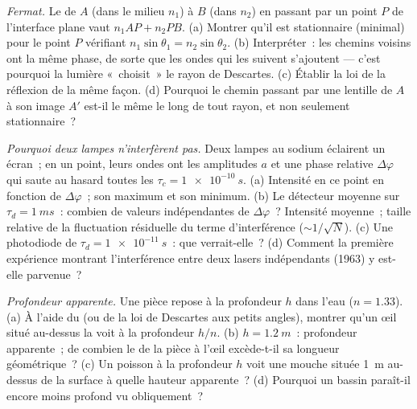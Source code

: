\begin{exercise}[$\star\star$]\label{exo:b2:scalar-light-model:7}
\emph{Fermat.} Le  de $A$ (dans le milieu $n_1$) à $B$ (dans
$n_2$) en passant par un point $P$ de l'interface plane vaut $n_1AP + n_2PB$. (a)
Montrer qu'il est stationnaire (minimal) pour le point $P$ vérifiant
$n_1\sin\theta_1 = n_2\sin\theta_2$. (b) Interpréter~: les chemins voisins ont la
même phase, de sorte que les ondes qui les suivent s'ajoutent --- c'est pourquoi la lumière
«~choisit~» le rayon de Descartes. (c) Établir la loi de la réflexion de la même
façon. (d) Pourquoi le chemin passant par une lentille de $A$ à son image $A'$ est-il le
même le long de tout rayon, et non seulement stationnaire~?
\end{exercise}

\begin{exercise}[$\star\star$]\label{exo:b2:scalar-light-model:8}
\emph{Pourquoi deux lampes n'interfèrent pas.} Deux lampes au sodium éclairent un
écran~; en un point, leurs ondes ont les amplitudes $a$ et une phase
relative $\Delta\varphi$ qui saute au hasard toutes les $\tau_c = \qty{1e-10}{s}$. (a)
Intensité en ce point en fonction de $\Delta\varphi$~; son maximum et son
minimum. (b) Le détecteur moyenne sur $\tau_d = \qty{1}{ms}$~: combien de
valeurs indépendantes de $\Delta\varphi$~? Intensité moyenne~; taille relative de la
fluctuation résiduelle du terme d'interférence ($\sim 1/\sqrt N$). (c) Une
photodiode de $\tau_d = \qty{1e-11}{s}$~: que verrait-elle~? (d) Comment
la première expérience montrant l'interférence entre deux lasers indépendants
(1963) y est-elle parvenue~?
\end{exercise}

\begin{exercise}[$\star\star$]\label{exo:b2:scalar-light-model:9}
\emph{Profondeur apparente.} Une pièce repose à la profondeur $h$ dans l'eau ($n = 1.33$).
(a) À l'aide du  (ou de la loi de Descartes aux petits angles), montrer
qu'un œil situé au-dessus la voit à la profondeur $h/n$. (b) $h = \qty{1.2}{m}$~: profondeur
apparente~; de combien le  de la pièce à l'œil
excède-t-il sa longueur géométrique~? (c) Un poisson à la profondeur $h$ voit une mouche située \qty{1}{m}
au-dessus de la surface à quelle hauteur apparente~? (d) Pourquoi un bassin paraît-il
encore moins profond vu obliquement~?
\end{exercise}

